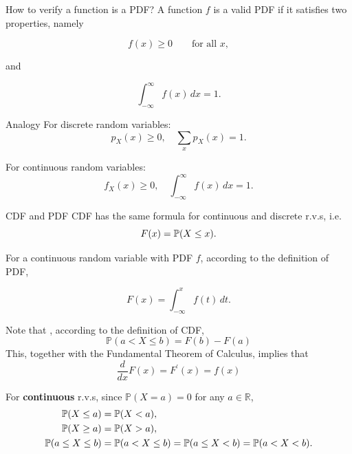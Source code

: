 \begin{frame}{How to verify a function is a PDF?}
A function $f$ is a valid PDF if it satisfies two properties, namely

\[
f(x)\geq 0
\qquad \text{for all }x,
\]

and

\[
\int_{-\infty}^{\infty} f(x)\,dx=1.
\]

\vspace{0.25cm}

\begin{keybox}{Analogy}
For discrete random variables:
\[
p_X(x)\geq 0, \quad \sum_x p_X(x)=1.
\]

For continuous random variables:
\[
f_X(x)\geq 0, \quad \int_{-\infty}^{\infty} f(x)\,dx=1.
\]
\end{keybox}
\end{frame}

\begin{frame}{CDF and PDF}
CDF has the same formula for continuous and discrete r.v.s, i.e.
\[
F(x)=\mathbb{P}(X\leq x).
\]

For a continuous random variable with PDF $f$, according to the definition of PDF,

\[
F(x)=\int_{-\infty}^{x} f(t)\,dt.
\]

Note that , according to the definition of CDF,
\begin{equation*}
    \mathbb{P}(a< X\leq b) = F(b) - F(a) 
\end{equation*}
This, together with the Fundamental Theorem of Calculus, implies that
\begin{equation}
    \frac{d}{dx}F(x) = F^{\prime}(x) = f(x)
\end{equation}



For \textbf{continuous} r.v.s, since $\mathbb{P}(X=a)=0$ for any $a\in \mathbb{R}$,
\[
\begin{aligned}
\mathbb{P}(X\le a) &= \mathbb{P}(X<a),\\
\mathbb{P}(X\ge a) &= \mathbb{P}(X>a),\\
\mathbb{P}(a\le X\le b) &= \mathbb{P}(a<X\le b)
= \mathbb{P}(a\le X<b)
= \mathbb{P}(a<X<b).
\end{aligned}
\]








\end{frame}


